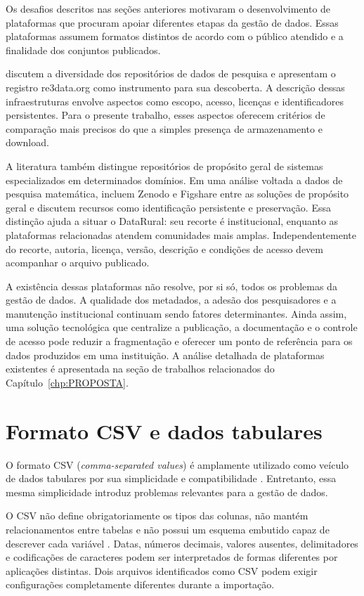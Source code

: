 Os desafios descritos nas seções anteriores motivaram o desenvolvimento de plataformas que procuram apoiar diferentes etapas da gestão de dados. Essas plataformas assumem formatos distintos de acordo com o público atendido e a finalidade dos conjuntos publicados.

 discutem a diversidade dos repositórios de dados de pesquisa e apresentam o registro re3data.org como instrumento para sua descoberta. A descrição dessas infraestruturas envolve aspectos como escopo, acesso, licenças e identificadores persistentes. Para o presente trabalho, esses aspectos oferecem critérios de comparação mais precisos do que a simples presença de armazenamento e download.

A literatura também distingue repositórios de propósito geral de sistemas especializados em determinados domínios. Em uma análise voltada a dados de pesquisa matemática,  incluem Zenodo e Figshare entre as soluções de propósito geral e discutem recursos como identificação persistente e preservação. Essa distinção ajuda a situar o DataRural: seu recorte é institucional, enquanto as plataformas relacionadas atendem comunidades mais amplas. Independentemente do recorte, autoria, licença, versão, descrição e condições de acesso devem acompanhar o arquivo publicado.

A existência dessas plataformas não resolve, por si só, todos os problemas da gestão de dados. A qualidade dos metadados, a adesão dos pesquisadores e a manutenção institucional continuam sendo fatores determinantes. Ainda assim, uma solução tecnológica que centralize a publicação, a documentação e o controle de acesso pode reduzir a fragmentação e oferecer um ponto de referência para os dados produzidos em uma instituição. A análise detalhada de plataformas existentes é apresentada na seção de trabalhos relacionados do Capítulo~\ref{chp:PROPOSTA}.

\section{Formato CSV e dados tabulares}

O formato CSV (\textit{comma-separated values}) é amplamente utilizado como veículo de dados tabulares por sua simplicidade e compatibilidade \cite{shafranovich2005csv}. Entretanto, essa mesma simplicidade introduz problemas relevantes para a gestão de dados.

O CSV não define obrigatoriamente os tipos das colunas, não mantém relacionamentos entre tabelas e não possui um esquema embutido capaz de descrever cada variável \cite{w3c2015csvw}. Datas, números decimais, valores ausentes, delimitadores e codificações de caracteres podem ser interpretados de formas diferentes por aplicações distintas. Dois arquivos identificados como CSV podem exigir configurações completamente diferentes durante a importação.

